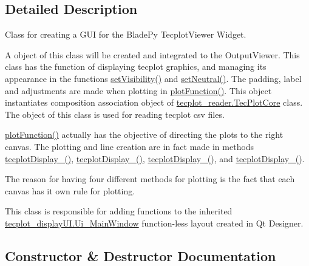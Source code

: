 \subsection{Detailed Description}
Class for creating a G\+UI for the Blade\+Py Tecplot\+Viewer Widget. 

A object of this class will be created and integrated to the Output\+Viewer. This class has the function of displaying tecplot graphics, and managing its appearance in the functions \hyperlink{classtecplot__modules_1_1tecplot__display_1_1_tec_plot_window_ae50e0f3c4051d791ed30a2e9de5233ea}{set\+Visibility()} and \hyperlink{classtecplot__modules_1_1tecplot__display_1_1_tec_plot_window_ad80163041f7884f536d1421860c4adc2}{set\+Neutral()}. The padding, label and adjustments are made when plotting in \hyperlink{classtecplot__modules_1_1tecplot__display_1_1_tec_plot_window_a62c9724fbeda8d8780e57559bada3282}{plot\+Function()}. This object instantiates composition association object of \hyperlink{classtecplot__modules_1_1tecplot__reader_1_1_tec_plot_core}{tecplot\+\_\+reader.\+Tec\+Plot\+Core} class. The object of this class is used for reading tecplot csv files.

\hyperlink{classtecplot__modules_1_1tecplot__display_1_1_tec_plot_window_a62c9724fbeda8d8780e57559bada3282}{plot\+Function()} actually has the objective of directing the plots to the right canvas. The plotting and line creation are in fact made in methods \hyperlink{classtecplot__modules_1_1tecplot__display_1_1_tec_plot_window_ae792d997329b65cfed0b8a0a5feaa1a2}{tecplot\+Display\+\_()}, \hyperlink{classtecplot__modules_1_1tecplot__display_1_1_tec_plot_window_aec1f3f862b488e5f66161ca7241908c1}{tecplot\+Display\+\_()}, \hyperlink{classtecplot__modules_1_1tecplot__display_1_1_tec_plot_window_ae29c235476c3ca1ff19f4b933b86ed86}{tecplot\+Display\+\_()}, and \hyperlink{classtecplot__modules_1_1tecplot__display_1_1_tec_plot_window_acdc9dc387494507084a2ab2cc0c8d9ac}{tecplot\+Display\+\_()}.

The reason for having four different methods for plotting is the fact that each canvas has it own rule for plotting.

This class is responsible for adding functions to the inherited \hyperlink{classtecplot__modules_1_1tecplot__display_u_i_1_1_ui___main_window}{tecplot\+\_\+display\+U\+I.\+Ui\+\_\+\+Main\+Window} function-\/less layout created in Qt Designer. 

\subsection{Constructor \& Destructor Documentation}
\hypertarget{classtecplot__modules_1_1tecplot__display_1_1_tec_plot_window_abc270dcf6e8aaa3a645ae0258c4a9e5e}{}\label{classtecplot__modules_1_1tecplot__display_1_1_tec_plot_window_abc270dcf6e8aaa3a645ae0258c4a9e5e} 
